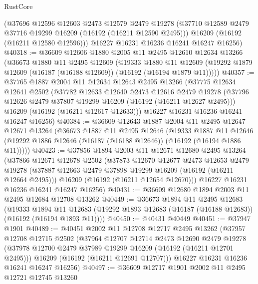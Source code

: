 \begin{lexlean}{RustCore}
\begin{coremodule}
      (@37696
        @12596
        @12603
        @2473
        @12579
        @2479
        @19278
        (@37710 @12589 @2479 @37716 @19299 @16209 (@16192 (@16211 @12590 @2495)))
        @16209
        (@16192 (@16211 @12580 @12596)))
      @16227
      @16231
      @16236
      @16241
      @16247
      @16256)
@40318 := @36609
    @12606
    @1880
    @2005
    @11
    @2495
    @12610
    @12634
    @13266
    (@36673
      @1880
      @11
      @2495
      @12609
      (@19333
        @1880
        @11
        @12609
        (@19292 @1879 @12609 (@16187 (@16188 @12609)) (@16192 (@16194 @1879 @11)))))
@40357 := @37765
    @1887
    @2004
    @11
    @12634
    @12643
    @2495
    @13266
    (@37775
      @12634
      @12641
      @2502
      (@37782
        @12633
        @12640
        @2473
        @12616
        @2479
        @19278
        (@37796 @12626 @2479 @37807 @19299 @16209 (@16192 (@16211 @12627 @2495)))
        @16209
        (@16192 (@16211 @12617 @12633)))
      @16227
      @16231
      @16236
      @16241
      @16247
      @16256)
@40384 := @36609
    @12643
    @1887
    @2004
    @11
    @2495
    @12647
    @12671
    @13264
    (@36673
      @1887
      @11
      @2495
      @12646
      (@19333
        @1887
        @11
        @12646
        (@19292 @1886 @12646 (@16187 (@16188 @12646)) (@16192 (@16194 @1886 @11)))))
@40423 := @37856
    @1894
    @2003
    @11
    @12671
    @12680
    @2495
    @13264
    (@37866
      @12671
      @12678
      @2502
      (@37873
        @12670
        @12677
        @2473
        @12653
        @2479
        @19278
        (@37887 @12663 @2479 @37898 @19299 @16209 (@16192 (@16211 @12664 @2495)))
        @16209
        (@16192 (@16211 @12654 @12670)))
      @16227
      @16231
      @16236
      @16241
      @16247
      @16256)
@40431 := @36609 @12680 @1894 @2003 @11 @2495 @12684 @12708 @13262
@40449 := @36673
    @1894
    @11
    @2495
    @12683
    (@19333
      @1894
      @11
      @12683
      (@19292 @1893 @12683 (@16187 (@16188 @12683)) (@16192 (@16194 @1893 @11))))
@40450 := @40431 @40449
@40451 := @37947 @1901
@40489 := @40451
    @2002
    @11
    @12708
    @12717
    @2495
    @13262
    (@37957
      @12708
      @12715
      @2502
      (@37964
        @12707
        @12714
        @2473
        @12690
        @2479
        @19278
        (@37978 @12700 @2479 @37989 @19299 @16209 (@16192 (@16211 @12701 @2495)))
        @16209
        (@16192 (@16211 @12691 @12707)))
      @16227
      @16231
      @16236
      @16241
      @16247
      @16256)
@40497 := @36609 @12717 @1901 @2002 @11 @2495 @12721 @12745 @13260

\end{coremodule}
\end{lexlean}
